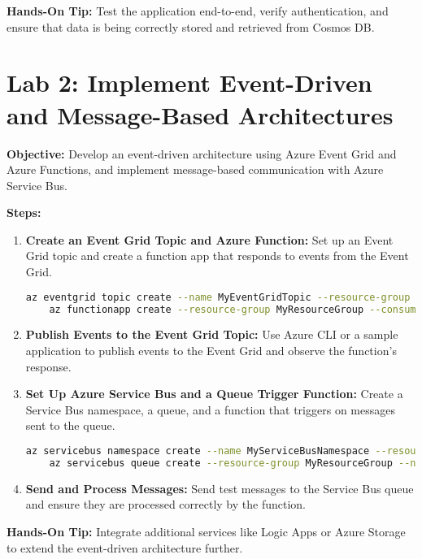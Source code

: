 \documentclass{article}
\begin{document}
\textbf{Hands-On Tip:} Test the application end-to-end, verify authentication, and ensure that data is being correctly stored and retrieved from Cosmos DB.

\section{Lab 2: Implement Event-Driven and Message-Based Architectures}
\textbf{Objective:} Develop an event-driven architecture using Azure Event Grid and Azure Functions, and implement message-based communication with Azure Service Bus.

\textbf{Steps:}
\begin{enumerate}
    \item \textbf{Create an Event Grid Topic and Azure Function:} Set up an Event Grid topic and create a function app that responds to events from the Event Grid.
    \begin{lstlisting}[language=bash]
    az eventgrid topic create --name MyEventGridTopic --resource-group MyResourceGroup --location eastus
    az functionapp create --resource-group MyResourceGroup --consumption-plan-location eastus --name MyFunctionApp --storage-account mystorageaccount --runtime dotnet
    \end{lstlisting}

    \item \textbf{Publish Events to the Event Grid Topic:} Use Azure CLI or a sample application to publish events to the Event Grid and observe the function's response.

    \item \textbf{Set Up Azure Service Bus and a Queue Trigger Function:} Create a Service Bus namespace, a queue, and a function that triggers on messages sent to the queue.
    \begin{lstlisting}[language=bash]
    az servicebus namespace create --name MyServiceBusNamespace --resource-group MyResourceGroup --location eastus
    az servicebus queue create --resource-group MyResourceGroup --namespace-name MyServiceBusNamespace --name MyQueue
    \end{lstlisting}

    \item \textbf{Send and Process Messages:} Send test messages to the Service Bus queue and ensure they are processed correctly by the function.
\end{enumerate}

\textbf{Hands-On Tip:} Integrate additional services like Logic Apps or Azure Storage to extend the event-driven architecture further.
\end{document}
